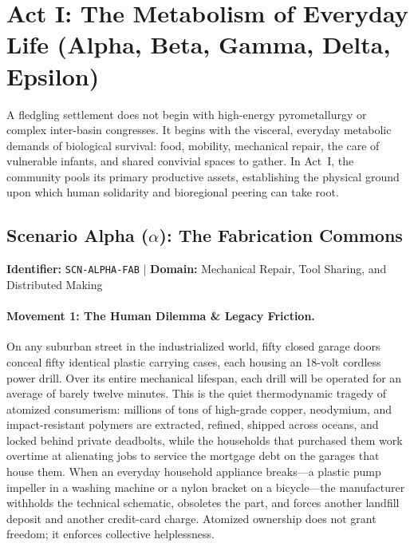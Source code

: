 \section{Act I: The Metabolism of Everyday Life (Alpha, Beta, Gamma, Delta, Epsilon)}
\label{sec:act_1_metabolism}

A fledgling settlement does not begin with high-energy pyrometallurgy or complex inter-basin congresses. It begins with the visceral, everyday metabolic demands of biological survival: food, mobility, mechanical repair, the care of vulnerable infants, and shared convivial spaces to gather. In Act~I, the community pools its primary productive assets, establishing the physical ground upon which human solidarity and bioregional peering can take root.

\subsection{Scenario Alpha (\texorpdfstring{$\alpha$}{Alpha}): The Fabrication Commons}
\label{subsec:scn_alpha}
\textbf{Identifier:} \texttt{SCN-ALPHA-FAB} \quad | \quad \textbf{Domain:} Mechanical Repair, Tool Sharing, and Distributed Making

\paragraph{Movement 1: The Human Dilemma \& Legacy Friction.}
On any suburban street in the industrialized world, fifty closed garage doors conceal fifty identical plastic carrying cases, each housing an 18-volt cordless power drill. Over its entire mechanical lifespan, each drill will be operated for an average of barely twelve minutes. This is the quiet thermodynamic tragedy of atomized consumerism: millions of tons of high-grade copper, neodymium, and impact-resistant polymers are extracted, refined, shipped across oceans, and locked behind private deadbolts, while the households that purchased them work overtime at alienating jobs to service the mortgage debt on the garages that house them. When an everyday household appliance breaks---a plastic pump impeller in a washing machine or a nylon bracket on a bicycle---the manufacturer withholds the technical schematic, obsoletes the part, and forces another landfill deposit and another credit-card charge. Atomized ownership does not grant freedom; it enforces collective helplessness.

